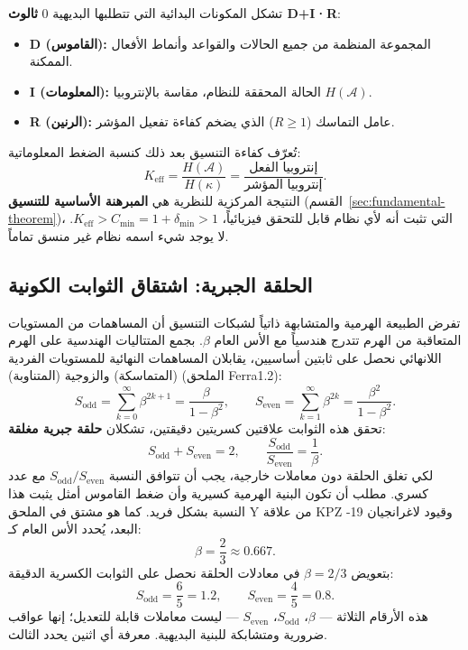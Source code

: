 \documentclass[11pt,a4paper]{article}
\begin{document}
	تشكل المكونات البدائية التي تتطلبها البديهية 0 \textbf{ثالوث D+I·R}:
	\begin{itemize}
		\item \textbf{D (القاموس):} المجموعة المنظمة من جميع الحالات والقواعد وأنماط الأفعال الممكنة.
		\item \textbf{I (المعلومات):} الحالة المحققة للنظام، مقاسة بالإنتروبيا $H(\mathcal{A})$.
		\item \textbf{R (الرنين):} عامل التماسك ($R \geq 1$) الذي يضخم كفاءة تفعيل المؤشر.
	\end{itemize}
	تُعرّف كفاءة التنسيق بعد ذلك كنسبة الضغط المعلوماتية:
	\[
	K_{\mathrm{eff}} = \frac{H(\mathcal{A})}{H(\kappa)} = \frac{\text{إنتروبيا الفعل}}{\text{إنتروبيا المؤشر}}.
	\]
	النتيجة المركزية للنظرية هي \textbf{المبرهنة الأساسية للتنسيق} (القسم~\ref{sec:fundamental-theorem})، التي تثبت أنه لأي نظام قابل للتحقق فيزيائياً، $K_{\mathrm{eff}} > C_{\min} = 1 + \delta_{\min} > 1$. لا يوجد شيء اسمه نظام غير منسق تماماً.
	
	\subsection{الحلقة الجبرية: اشتقاق الثوابت الكونية}
	\label{subsec:algebraic-loop}
	
	تفرض الطبيعة الهرمية والمتشابهة ذاتياً لشبكات التنسيق أن المساهمات من المستويات المتعاقبة من الهرم تتدرج هندسياً مع الأس العام $\beta$. بجمع المتتاليات الهندسية على الهرم اللانهائي نحصل على ثابتين أساسيين، يقابلان المساهمات النهائية للمستويات الفردية (المتماسكة) والزوجية (المتناوبة) (الملحق Ferra1.2):
	\[
	S_{\mathrm{odd}} = \sum_{k=0}^{\infty} \beta^{2k+1} = \frac{\beta}{1-\beta^{2}}, \qquad
	S_{\mathrm{even}} = \sum_{k=1}^{\infty} \beta^{2k} = \frac{\beta^{2}}{1-\beta^{2}}.
	\]
	تحقق هذه الثوابت علاقتين كسريتين دقيقتين، تشكلان \textbf{حلقة جبرية مغلقة}:
	\[
	\boxed{S_{\mathrm{odd}} + S_{\mathrm{even}} = 2, \qquad \frac{S_{\mathrm{odd}}}{S_{\mathrm{even}}} = \frac{1}{\beta}}.
	\]
	لكي تغلق الحلقة دون معاملات خارجية، يجب أن تتوافق النسبة $S_{\mathrm{odd}}/S_{\mathrm{even}}$ مع عدد كسري. مطلب أن تكون البنية الهرمية كسيرية وأن ضغط القاموس أمثل يثبت هذا النسبة بشكل فريد. كما هو مشتق في الملحق Y من علاقة KPZ وقيود لاغرانجيان 19-البعد، يُحدد الأس العام كـ:
	\[
	\beta = \frac{2}{3} \approx 0.667.
	\]
	بتعويض $\beta = 2/3$ في معادلات الحلقة نحصل على الثوابت الكسرية الدقيقة:
	\[
	S_{\mathrm{odd}} = \frac{6}{5} = 1.2,\qquad S_{\mathrm{even}} = \frac{4}{5} = 0.8.
	\]
	هذه الأرقام الثلاثة — $\beta$، $S_{\mathrm{odd}}$، $S_{\mathrm{even}}$ — ليست معاملات قابلة للتعديل؛ إنها عواقب ضرورية ومتشابكة للبنية البديهية. معرفة أي اثنين يحدد الثالث.
	
\end{document}
